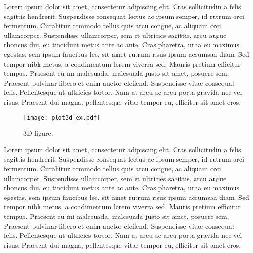 \documentclass[10pt]{report}
\begin{document}
Lorem ipsum dolor sit amet, consectetur adipiscing elit. Cras sollicitudin a felis sagittis hendrerit. Suspendisse consequat lectus ac ipsum semper, id rutrum orci fermentum. Curabitur commodo tellus quis arcu congue, ac aliquam orci ullamcorper. Suspendisse ullamcorper, sem et ultricies sagittis, arcu augue rhoncus dui, eu tincidunt metus ante ac ante. Cras pharetra, urna eu maximus egestas, sem ipsum faucibus leo, sit amet rutrum risus ipsum accumsan diam. Sed tempor nibh metus, a condimentum lorem viverra sed. Mauris pretium efficitur tempus. Praesent eu mi malesuada, malesuada justo sit amet, posuere sem. Praesent pulvinar libero et enim auctor eleifend. Suspendisse vitae consequat felis. Pellentesque ut ultricies tortor. Nam at arcu ac arcu porta gravida nec vel risus. Praesent dui magna, pellentesque vitae tempor eu, efficitur sit amet eros.

\begin{figure}[H]
	\centering
	\texttt{[image: plot3d\_ex.pdf]}
	\caption{3D figure.}
\end{figure}

Lorem ipsum dolor sit amet, consectetur adipiscing elit. Cras sollicitudin a felis sagittis hendrerit. Suspendisse consequat lectus ac ipsum semper, id rutrum orci fermentum. Curabitur commodo tellus quis arcu congue, ac aliquam orci ullamcorper. Suspendisse ullamcorper, sem et ultricies sagittis, arcu augue rhoncus dui, eu tincidunt metus ante ac ante. Cras pharetra, urna eu maximus egestas, sem ipsum faucibus leo, sit amet rutrum risus ipsum accumsan diam. Sed tempor nibh metus, a condimentum lorem viverra sed. Mauris pretium efficitur tempus. Praesent eu mi malesuada, malesuada justo sit amet, posuere sem. Praesent pulvinar libero et enim auctor eleifend. Suspendisse vitae consequat felis. Pellentesque ut ultricies tortor. Nam at arcu ac arcu porta gravida nec vel risus. Praesent dui magna, pellentesque vitae tempor eu, efficitur sit amet eros.
\end{document}
